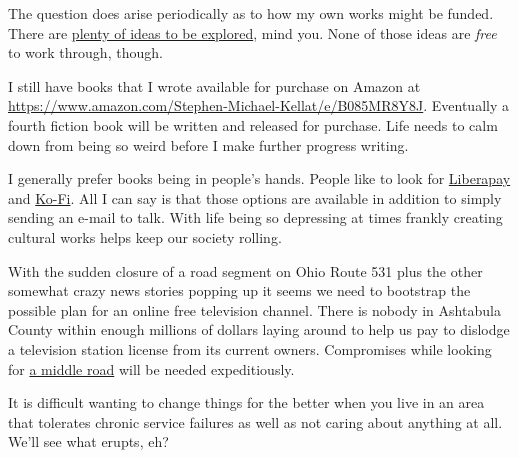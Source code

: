 The question does arise periodically as to how my own works might be
funded. There are
\href{https://web.archive.org/web/20221208053021/https://erielookingproductions.info/statement/}{plenty
of ideas to be explored}, mind you. None of those ideas are \emph{free}
to work through, though.

I still have books that I wrote available for purchase on Amazon at
\url{https://www.amazon.com/Stephen-Michael-Kellat/e/B085MR8Y8J}.
Eventually a fourth fiction book will be written and released for
purchase. Life needs to calm down from being so weird before I make
further progress writing.

I generally prefer books being in people's hands. People like to look
for \href{https://liberapay.com/smkellat}{Liberapay} and
\href{https://ko-fi.com/smkellat}{Ko-Fi}. All I can say is that those
options are available in addition to simply sending an e-mail to talk.
With life being so depressing at times frankly creating cultural works
helps keep our society rolling.

With the sudden closure of a road segment on Ohio Route 531 plus the
other somewhat crazy news stories popping up it seems we need to
bootstrap the possible plan for an online free television channel. There
is nobody in Ashtabula County within enough millions of dollars laying
around to help us pay to dislodge a television station license from its
current owners. Compromises while looking for
\href{https://coyote.works/}{a middle road} will be needed
expeditiously.

It is difficult wanting to change things for the better when you live in
an area that tolerates chronic service failures as well as not caring
about anything at all. We'll see what erupts, eh?
